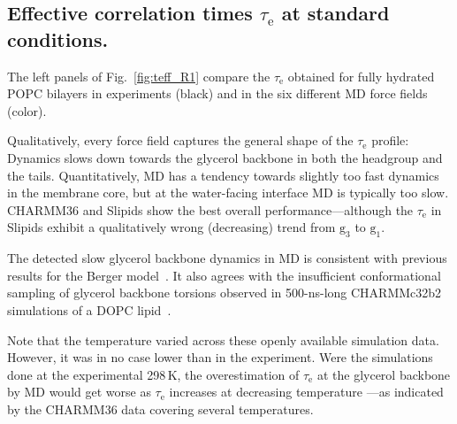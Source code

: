 \documentclass[journal=jpcbfk,manuscript=article,layout=twocolumn]{achemso}
\begin{document}
\subsection*{Effective correlation times $\tau_\mathrm e$ at standard conditions.}
The left panels of Fig.~\ref{fig:teff_R1} compare the $\tau_\mathrm{e}$ obtained for fully hydrated POPC bilayers in experiments (black) and in the six different MD force fields (color).

Qualitatively, every force field captures the general shape of the $\tau_\mathrm{e}$ profile: Dynamics slows down towards the glycerol backbone in both the headgroup and the tails. Quantitatively, MD has a tendency towards
slightly too fast dynamics in the membrane core,
but
at the water-facing interface MD is typically too slow.
CHARMM36 and Slipids show the best overall performance---although the $\tau_\mathrm{e}$ in Slipids exhibit a qualitatively wrong (decreasing) trend from $\mathrm g_{3}$ to $\mathrm g_{1}$.

The detected slow glycerol backbone dynamics in MD is consistent with previous results for the Berger model~\cite{ferreira15}. It also agrees with the  insufficient conformational sampling of glycerol backbone torsions observed in 500-ns-long CHARMMc32b2~\cite{schlenkrich96,feller00} simulations of a DOPC lipid~\cite{vogel12}. %


Note that the temperature varied across these openly available simulation data. However, it was in no case lower than in the experiment. %
Were the simulations done at the experimental 298\,K, the overestimation of $\tau_\mathrm{e}$ at the glycerol backbone by MD would get worse as $\tau_\mathrm{e}$  increases at decreasing temperature
---as indicated by the CHARMM36 data covering several temperatures.
\end{document}
